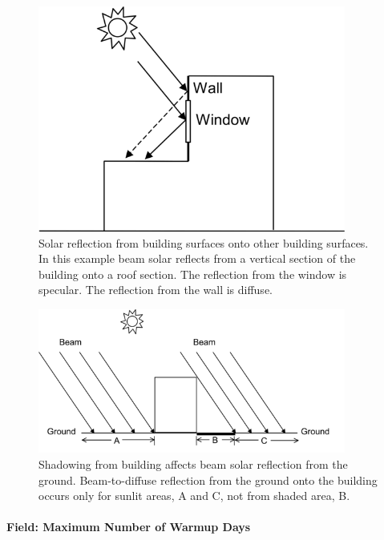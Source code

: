 \begin{figure}[hbtp] %
\centering
\includegraphics[width=0.9\textwidth, height=0.7\textheight, keepaspectratio=true]{media/image004.png}
\caption{  Solar reflection from building surfaces onto other building surfaces. In this example beam solar reflects from a vertical section of the building onto a roof section. The reflection from the window is specular. The reflection from the wall is diffuse. \protect \label{fig:solar-reflection-from-building-surfaces-onto}}
\end{figure}

\begin{figure}[hbtp] %
\centering
\includegraphics[width=0.9\textwidth, height=0.7\textheight, keepaspectratio=true]{media/image005.png}
\caption{Shadowing from building affects beam solar reflection from the ground. Beam-to-diffuse reflection from the ground onto the building occurs only for sunlit areas, A and C, not from shaded area, B. \protect \label{fig:shadowing-from-building-affects-beam-solar}}
\end{figure}

\paragraph{Field: Maximum Number of Warmup Days}\label{field-maximum-number-of-warmup-days}


